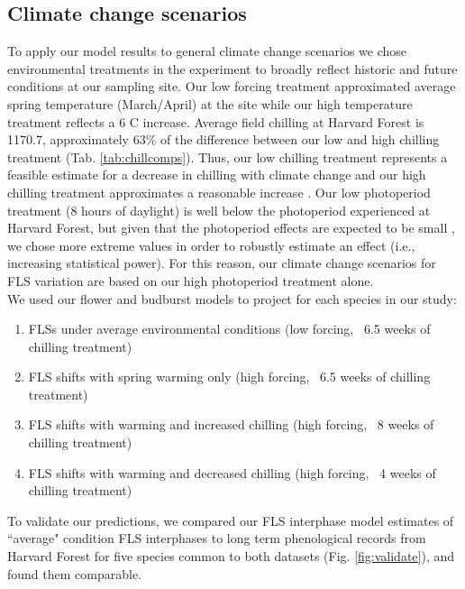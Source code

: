 \documentclass[12pt]{article}\usepackage[]{graphicx}\usepackage[]{color}
\begin{document}
\subsection*{Climate change scenarios}
\noindent To apply our model results to general climate change scenarios we chose environmental treatments in the experiment to broadly reflect historic and future conditions at our sampling site. Our low forcing treatment approximated average spring temperature (March/April) at the site while our high temperature treatment reflects a 6 \degree C increase. Average field chilling \citep[calculated from 15 October - 15 April, measured in Chill Hours,][]{Weinberger:1950aa} at Harvard Forest is 1170.7, approximately  63\% of the difference between our low and high chilling treatment (Tab. \ref{tab:chillcomps}). Thus, our low chilling treatment represents a feasible estimate for a decrease in chilling with climate change and our high chilling treatment approximates a reasonable increase \citep{Luedeling:2012aa}. Our low photoperiod treatment (8 hours of daylight) is well below the photoperiod experienced at Harvard Forest, but given that the photoperiod effects are expected to be small \citep{Laube:2014a}, we chose more extreme values in order to robustly estimate an effect (i.e., increasing statistical power). For this reason, our climate change scenarios for FLS variation are based on our high photoperiod treatment alone.\\


\noindent We used our flower and budburst models to project for each species in our study:
\begin{enumerate}
\item FLSs under average environmental conditions  (low forcing, ~6.5 weeks of chilling treatment)
\item FLS shifts with spring warming only (high forcing, ~6.5 weeks of chilling treatment)
\item FLS shifts with warming and increased chilling (high forcing, ~8 weeks of chilling treatment)
\item FLS shifts with warming and decreased chilling (high forcing, ~4 weeks of chilling treatment)
\end{enumerate}

\noindent To validate our predictions, we compared our FLS interphase model estimates of ``average" condition FLS interphases to long term phenological records from Harvard Forest \citep{OKeefe2015} for five species common to both datasets (Fig. \ref{fig:validate}), and found them comparable. \\
\end{document}
